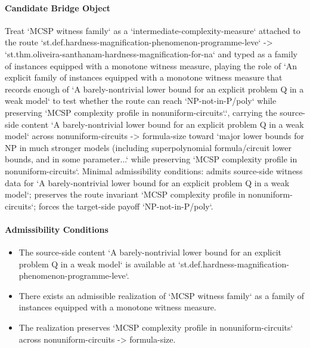 \documentclass[11pt]{article}
\begin{document}
\paragraph{Candidate Bridge Object}
Treat `MCSP witness family` as a `intermediate-complexity-measure` attached to the route `st.def.hardness-magnification-phenomenon-programme-leve` -> `st.thm.oliveira-santhanam-hardness-magnification-for-na` and typed as a family of instances equipped with a monotone witness measure, playing the role of `An explicit family of instances equipped with a monotone witness measure that records enough of `A barely-nontrivial lower bound for an explicit problem Q in a weak model` to test whether the route can reach `NP-not-in-P/poly` while preserving `MCSP complexity profile in nonuniform-circuits`.`, carrying the source-side content `A barely-nontrivial lower bound for an explicit problem Q in a weak model` across nonuniform-circuits -> formula-size toward `major lower bounds for NP in much stronger models (including superpolynomial formula/circuit lower bounds, and in some parameter...` while preserving `MCSP complexity profile in nonuniform-circuits`. Minimal admissibility conditions: admits source-side witness data for `A barely-nontrivial lower bound for an explicit problem Q in a weak model`; preserves the route invariant `MCSP complexity profile in nonuniform-circuits`; forces the target-side payoff `NP-not-in-P/poly`.
\paragraph{Admissibility Conditions}
\begin{itemize}
\item The source-side content `A barely-nontrivial lower bound for an explicit problem Q in a weak model` is available at `st.def.hardness-magnification-phenomenon-programme-leve`.
\item There exists an admissible realization of `MCSP witness family` as a family of instances equipped with a monotone witness measure.
\item The realization preserves `MCSP complexity profile in nonuniform-circuits` across nonuniform-circuits -> formula-size.
\end{itemize}
\end{document}
